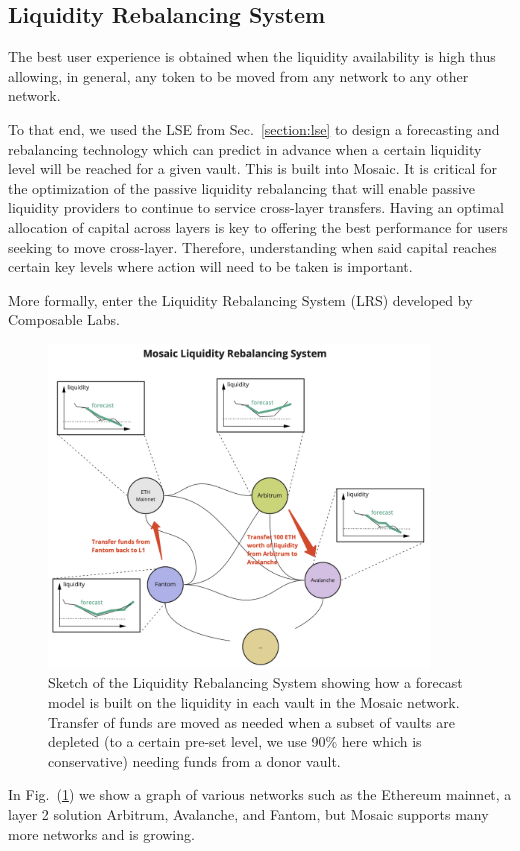 \subsection{Liquidity Rebalancing System\label{section:lrs}}

The best user experience is obtained when the liquidity availability is high thus allowing, in general, any token to be moved from any network to any other network.

To that end, we used the LSE from Sec.~\ref{section:lse} to design a forecasting and rebalancing technology which can predict in advance when a certain liquidity level will be reached for a given vault. This is built into Mosaic.
%
It is critical for the optimization of the passive liquidity rebalancing that will enable passive liquidity providers to continue to service cross-layer transfers.
%
Having an optimal allocation of capital across layers is key to offering the best performance for users seeking to move cross-layer. Therefore, understanding when said capital reaches certain key levels where action will need to be taken is important.

More formally, enter the Liquidity Rebalancing System (LRS) developed by Composable Labs.
%
\begin{figure}
    \centering
    \includegraphics[width=0.9\textwidth]{images/lrs.png}
    \caption{Sketch of the Liquidity Rebalancing System showing how a forecast model is built on the liquidity in each vault in the Mosaic network. Transfer of funds are moved as needed when a subset of vaults are depleted (to a certain pre-set level, we use 90\% here which is conservative) needing funds from a donor vault.}
    \label{fig:lrs}
\end{figure}
%
In Fig.~(\ref{fig:lrs}) we show a graph of various networks such as the Ethereum mainnet, a layer 2 solution Arbitrum, Avalanche, and Fantom, but Mosaic supports many more networks and is growing.

